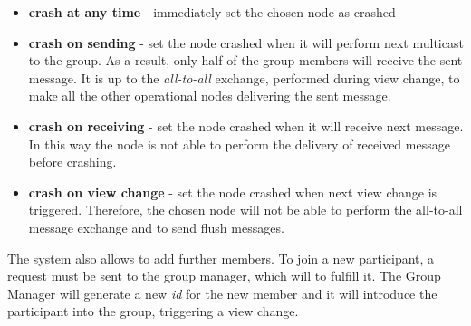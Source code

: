 \documentclass[11pt]{article}
\begin{document}
	\begin{itemize}
		\item \textbf{crash at any time} - immediately set the chosen node as crashed
		\item \textbf{crash on sending} - set the node crashed when it will perform next multicast to the group. As a result, only half of the group members will receive the sent message. It is up to the \textit{all-to-all} exchange, performed during view change, to make all the other operational nodes delivering the sent message.
		\item \textbf{crash on receiving} - set the node crashed when it will receive next message. In this way the node is not able to perform the delivery of received message before crashing.
		\item \textbf{crash on view change} - set the node crashed when next view change is triggered. Therefore, the chosen node will not be able to perform the all-to-all message exchange and to send flush messages.
	\end{itemize}
	
	The system also allows to add further members. To join a new participant, a request must be sent to the group manager, which will to fulfill it. The Group Manager will generate a new \textit{id} for the new member and it will introduce the participant into the group, triggering a view change.
		
\end{document}
